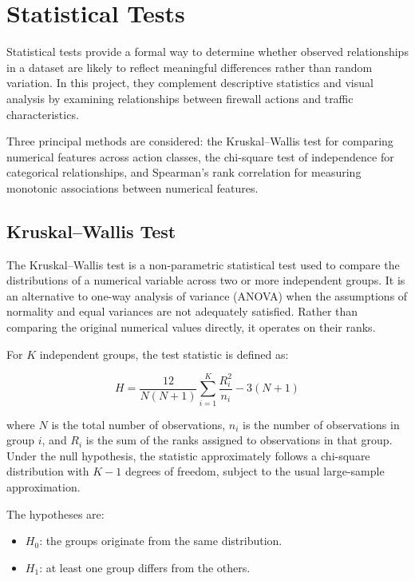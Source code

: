 \section{Statistical Tests}

Statistical tests provide a formal way to determine whether observed relationships in a dataset are likely to reflect meaningful differences rather than random variation. In this project, they complement descriptive statistics and visual analysis by examining relationships between firewall actions and traffic characteristics.

Three principal methods are considered: the Kruskal--Wallis test for comparing numerical features across action classes, the chi-square test of independence for categorical relationships, and Spearman's rank correlation for measuring monotonic associations between numerical features.

\subsection{Kruskal--Wallis Test}

The Kruskal--Wallis test is a non-parametric statistical test used to compare the distributions of a numerical variable across two or more independent groups. It is an alternative to one-way analysis of variance (ANOVA) when the assumptions of normality and equal variances are not adequately satisfied. Rather than comparing the original numerical values directly, it operates on their ranks.

For $K$ independent groups, the test statistic is defined as:

\begin{equation}
H =
\frac{12}{N(N+1)}
\sum_{i=1}^{K}\frac{R_i^2}{n_i}
-3(N+1)
\label{eq:kruskal_wallis}
\end{equation}

where $N$ is the total number of observations, $n_i$ is the number of observations in group $i$, and $R_i$ is the sum of the ranks assigned to observations in that group. Under the null hypothesis, the statistic approximately follows a chi-square distribution with $K-1$ degrees of freedom, subject to the usual large-sample approximation.

The hypotheses are:

\begin{itemize}
  \item $H_0$: the groups originate from the same distribution.
  \item $H_1$: at least one group differs from the others.
\end{itemize}

